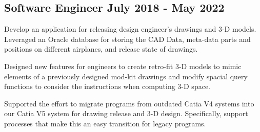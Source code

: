 \subsection{{Software Engineer \hfill July 2018 - May 2022}}
\begin{zitemize}
\item Develop an application for releasing design engineer's drawings and 3-D models. Leveraged an Oracle database for storing the CAD Data, meta-data parts and positions on different airplanes, and release state of drawings.
\item Designed new features for engineers to create retro-fit 3-D models to mimic elements of a previously designed mod-kit drawings and modify spacial query functions to consider the instructions when computing 3-D space.
\item Supported the effort to migrate programs from outdated Catia V4 systems into our Catia V5 system for drawing release and 3-D design. Specifically, support processes that make this an easy transition for legacy programs.
\end{zitemize}


